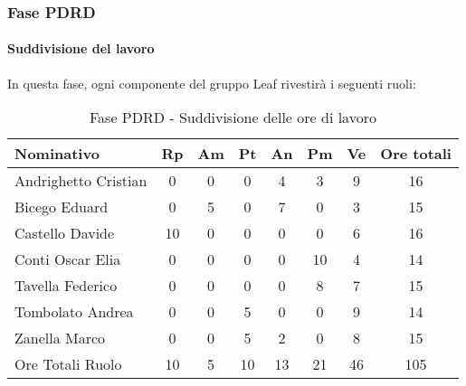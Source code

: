 \documentclass[../PianoProgetto.tex]{subfiles}
\begin{document}
	\subsubsection{Fase PDRD}
				\paragraph{Suddivisione del lavoro}
					In questa fase, ogni componente del gruppo Leaf rivestirà i seguenti ruoli:
	
					\begin{table}[h]
		\centering
	
		\begin{tabular}{l * {7}{c}}
			\toprule
			Nominativo & Rp & Am & Pt & An & Pm & Ve & Ore totali \\
			\midrule
			Andrighetto Cristian & 0 & 0 & 0 & 4 & 3 & 9 & 16 \\
			\midrule
			Bicego Eduard & 0 & 5 &	0 &	7 &	0 &	3 &	15 \\
			\midrule
			Castello Davide & 10 & 0 & 0 & 0 & 0 & 6 & 16 \\
			\midrule
			Conti Oscar Elia & 0 & 0 & 0 & 0 & 10 &	4 &	14 \\
			\midrule
			Tavella Federico &	0 & 0 &	0 &	0 &	8 &	7 &	15 \\
			\midrule
			Tombolato Andrea & 0 & 0 & 5 & 0 & 0 & 9 & 14 \\
			\midrule
			Zanella Marco & 0 & 0 & 5 &	2 &	0 &	8 &	15 \\
			\midrule			
			Ore Totali Ruolo & 10 & 5 & 10 & 13 &	21 & 46 & 105 \\
			\bottomrule
			
		\end{tabular}
		
		\caption{Fase PDRD - Suddivisione delle ore di lavoro}
		\label{tab:fasePDRD_ore}
		
	\end{table}
	
\end{document}
